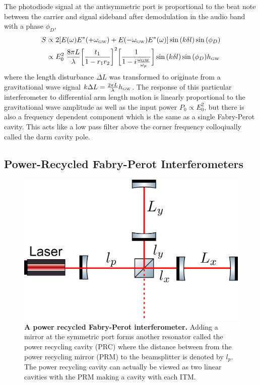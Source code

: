		The photodiode signal at the antisymmetric port is proportional to the beat note between the carrier and signal sideband after demodulation in the audio band with a phase $\phi_{D}$,
		\begin{equation}
		\begin{aligned}
			S &\propto 2 [E(\omega) E^*(+\omega_{\text{\tiny GW}}) +  E(-\omega_{\text{\tiny GW}}) E^*(\omega) ] \sin{(k\delta l)} \sin{(\phi_{D})} \\
			  &\propto E_0^2 \; \frac{8\pi L}{\lambda}  \bigg[\frac{t_1}{1-r_1r_2}\bigg]^2 \bigg[\frac{1}{1 - i \frac{\omega_{\text{\tiny GW}}}{\omega_p}}\bigg] \sin{(k\delta l)} \sin{(\phi_{D})} h_{\text{\tiny GW}}
		\end{aligned}
		\end{equation}
		where the length disturbance $\Delta L$ was transformed to originate from a gravitational wave signal $k \Delta L = \frac{2\pi L}{\lambda} h_{\text{\tiny GW}}$.
		The response of this particular interferometer to differential arm length motion is linearly proportional to the gravitational wave amplitude as well as the input power $P_0 \propto E_0^2$, but there is also a frequency dependent component which is the same as a single Fabry-Perot cavity. This acts like a low pass filter above the corner frequency colloqiually called the darm cavity pole.

		\subsection{Power-Recycled Fabry-Perot Interferometers}
		
		\begin{figure}[ht]
			\centering
			\includegraphics[width=0.5 \textwidth]{../Figures/PRFP_Mich.png}
			\caption[A power recycled Fabry-Perot interferometer.]{\textbf{A power recycled Fabry-Perot interferometer.} Adding a mirror at the symmetric port forms another resonator called the power recycling cavity (PRC) where the distance between from the power recycling mirror (PRM) to the beamsplitter is denoted by $l_p$.  The power recycling cavity can actually be viewed as two linear cavities with the PRM making a cavity with each ITM. }
			\label{fig:PRFPMich}
		\end{figure}

